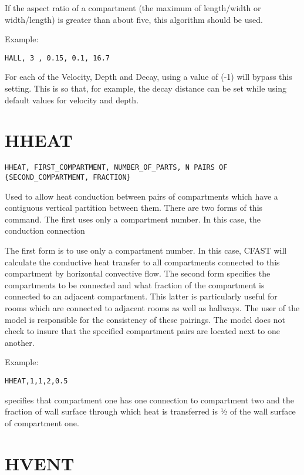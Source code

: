 If the aspect ratio of a compartment (the maximum of length/width or width/length) is greater than about five, this algorithm should be used.

Example:

\begin{lstlisting}
HALL, 3 , 0.15, 0.1, 16.7
\end{lstlisting}

For each of the Velocity, Depth and Decay, using a value of (-1) will bypass this setting. This is so that, for example, the decay distance can be set while using default values for velocity and depth.

\section{HHEAT}

\begin{lstlisting}
HHEAT, FIRST_COMPARTMENT, NUMBER_OF_PARTS, N PAIRS OF {SECOND_COMPARTMENT, FRACTION}
\end{lstlisting}

Used to allow heat conduction between pairs of compartments which have a contiguous vertical partition between them.  There are two forms of this command. The first uses only a compartment number. In this case, the conduction connection 

The first form is to use only a compartment number. In this case, CFAST will calculate the conductive heat transfer to all compartments connected to this compartment by horizontal convective flow. The second form specifies the compartments to be connected and what fraction of the compartment is connected to an adjacent compartment. This latter is particularly useful for rooms which are connected to adjacent rooms as well as hallways. The user of the model is responsible for the consistency of these pairings.  The model does not check to insure that the specified compartment pairs are located next to one another.

Example:

\begin{lstlisting}
HHEAT,1,1,2,0.5
\end{lstlisting}

specifies that compartment one has one connection to compartment two and the fraction of wall surface through which heat is transferred is ½ of the wall surface of compartment one.

\section{HVENT}

